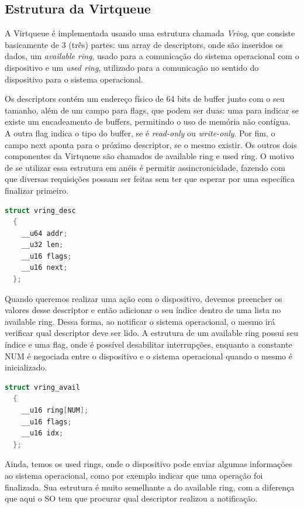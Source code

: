 \subsection*{Estrutura da Virtqueue}

A Virtqueue é implementada usando uma estrutura chamada \emph{Vring}, que consiste basicamente de 3 (três) partes: um array de descriptors, onde são inseridos os dados,
um \emph{available ring}, usado para a comunicação do sistema operacional com o dispositivo e um \emph{used ring}, utilizado para a comunicação no sentido do dispositivo para o sistema operacional.

Os descriptors contém um endereço físico de 64 bits de buffer junto com o seu tamanho, além de um campo para flags, que podem ser duas: uma para indicar se existe um encadeamento de buffers, permitindo o uso de memória não contígua. 
A outra flag indica o tipo do buffer, se é \emph{read-only} ou \emph{write-only}. Por fim, o campo next aponta para o próximo descriptor, se o mesmo existir. Os outros dois componentes da Virtqueue são chamados de available ring e used ring. O motivo de se utilizar essa estrutura em anéis é permitir assincronicidade, fazendo com que diversas requisições possam ser feitas sem ter que esperar por uma específica finalizar primeiro.

\begin{lstlisting}[language=C]
  struct vring_desc
  {
    __u64 addr;
    __u32 len;
    __u16 flags;
    __u16 next;
  };
\end{lstlisting}


Quando queremos realizar uma ação com o dispositivo, devemos preencher os valores desse descriptor e então adicionar o seu índice dentro de uma lista no available ring.
Dessa forma, ao notificar o sistema operacional, o mesmo irá verificar qual descriptor deve ser lido. A estrutura de um available ring possui seu índice e uma flag, onde é possível desabilitar interrupções, enquanto a constante NUM é negociada entre o dispositivo e o sistema operacional quando o mesmo é inicializado.

\begin{lstlisting}[language=C]
  struct vring_avail
  {
    __u16 ring[NUM];
    __u16 flags;
    __u16 idx;
  };
\end{lstlisting}

Ainda, temos os used rings, onde o dispositivo pode enviar algumas informações ao sistema operacional, como por exemplo indicar que uma operação foi finalizada.
Sua estrutura é muito semelhante a do available ring, com a diferença que aqui o SO tem que procurar qual descriptor realizou a notificação.

